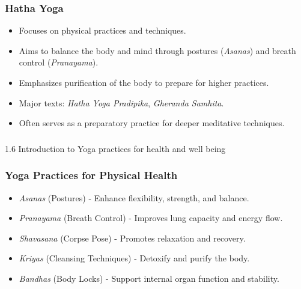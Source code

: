 \begin{frame}[fragile]\frametitle{Hatha Yoga}

      \begin{itemize}
		\item Focuses on physical practices and techniques.
		\item Aims to balance the body and mind through postures (\textit{Asanas}) and breath control (\textit{Pranayama}).
		\item Emphasizes purification of the body to prepare for higher practices.
		\item Major texts: \textit{Hatha Yoga Pradipika}, \textit{Gheranda Samhita}.
		\item Often serves as a preparatory practice for deeper meditative techniques.
	  \end{itemize}

\end{frame}



\begin{frame}[fragile]\frametitle{}
\begin{center}
{\Large 1.6 Introduction to Yoga practices for health and well being}
\end{center}
\end{frame}

\begin{frame}[fragile]\frametitle{Yoga Practices for Physical Health}

      \begin{itemize}
		\item \textit{Asanas} (Postures) - Enhance flexibility, strength, and balance.
		\item \textit{Pranayama} (Breath Control) - Improves lung capacity and energy flow.
		\item \textit{Shavasana} (Corpse Pose) - Promotes relaxation and recovery.
		\item \textit{Kriyas} (Cleansing Techniques) - Detoxify and purify the body.
		\item \textit{Bandhas} (Body Locks) - Support internal organ function and stability.
	  \end{itemize}

\end{frame}

